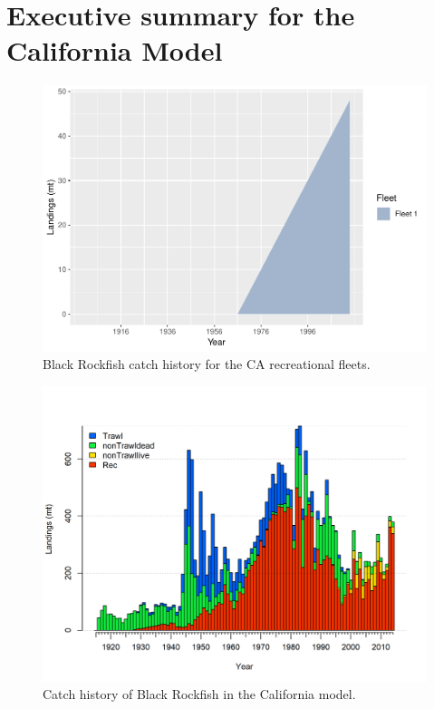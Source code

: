 \documentclass[12pt,]{article}
\begin{document}
\section*{Executive summary for the California
Model}\label{executive-summary-for-the-california-model}

\FloatBarrier

\begin{figure}[htbp]
\centering
\includegraphics{00_Assessment_Compile_files/figure-latex/unnamed-chunk-4-1.pdf}
\caption{Black Rockfish catch history for the CA recreational fleets.
\label{fig:Exec_catch1}}
\end{figure}

\FloatBarrier

\begin{figure}[htbp]
\centering
\includegraphics{r4ss/plots_mod1/catch2 landings stacked.png}
\caption{Catch history of Black Rockfish in the California model.
\label{fig:r4ss_catches}}
\end{figure}
\end{document}
